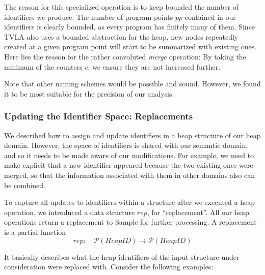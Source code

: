 \documentclass[11pt,a4paper,english]{article}
\begin{document}
The reason for this specialized operation is to keep bounded the number of identifiers
we produce. The number of program points $pp$ contained in our identifiers is
clearly bounded, as every program has finitely many of them. Since TVLA also
uses a bounded abstraction for the heap, new nodes repeatedly created at a given
program point will start to be summarized with existing ones. Here lies the
reason for the rather convoluted \textit{merge} operation: By taking the minimum
of the counters $c$, we ensure they are not increased further.

Note that other naming schemes would be possible and sound. However, we found it
to be most suitable for the precision of our analysis. 

\subsubsection{Updating the Identifier Space: Replacements}
We described how to assign and update identifiers in a heap structure of
our heap domain. However, the space of identifiers is shared with our semantic domain,
and so it needs to be made aware of our modifications. For example, we
need to make explicit that a new identifier appeared because the two existing
ones were merged, so that the information associated with them in other domains
also can be combined.

To capture all updates to identifiers within a structure after we executed a
heap operation, we introduced a data structure $rep$, for ``replacement''. All our heap operations return a replacement to Sample for further processing. A replacement is a partial function
\[
rep : \quad \mathcal{P}\left( HeapID \right) \rightarrow \mathcal{P}\left(HeapID\right)
\]

It basically describes what the heap identifiers of the input structure under
consideration were replaced with. Consider the following examples:
\end{document}
